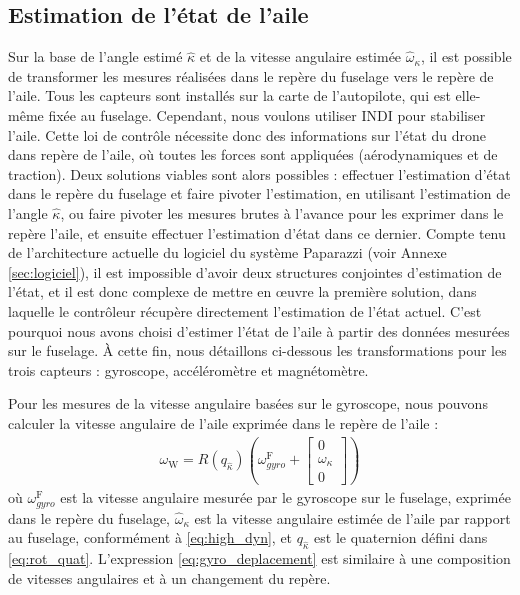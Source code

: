 \subsection{Estimation de l'état de l'aile}

Sur la base de l'angle estimé $\hat{\kappa}$ et de la vitesse angulaire estimée $\hat{\omega}_{\kappa}$, il est possible de transformer les mesures réalisées dans le repère du fuselage vers le repère de l'aile. Tous les capteurs sont installés sur la carte de l'autopilote, qui est elle-même fixée au fuselage. Cependant, nous voulons utiliser INDI pour stabiliser l'aile. Cette loi de contrôle nécessite donc des informations sur l'état du drone dans repère de l'aile, où toutes les forces sont appliquées (aérodynamiques et de traction).
Deux solutions viables sont alors possibles : effectuer l'estimation d'état dans le repère du fuselage et faire pivoter l'estimation, en utilisant l'estimation de l'angle $\hat{\kappa}$, ou faire pivoter les mesures brutes à l'avance pour les exprimer dans le repère l'aile, et ensuite effectuer l'estimation d'état dans ce dernier. 
Compte tenu de l'architecture actuelle du logiciel du système Paparazzi (voir Annexe \ref{sec:logiciel}), il est impossible d'avoir deux structures conjointes d'estimation de l'état, et il est donc complexe de mettre en œuvre la première solution, dans laquelle le contrôleur récupère directement l'estimation de l'état actuel. C'est pourquoi nous avons choisi d'estimer l'état de l'aile à partir des données mesurées sur le fuselage. À cette fin, nous détaillons ci-dessous les transformations pour les trois capteurs : gyroscope, accéléromètre et magnétomètre. 

Pour les mesures de la vitesse angulaire basées sur le gyroscope, nous pouvons calculer la vitesse angulaire de l'aile exprimée dans le repère de l'aile :
\begin{align}
    \label{eq:gyro_deplacement}
    \omega_{\text{W}} = R(q_{\hat{\kappa}}) \left( \omega_{gyro}^{\text{F}} + \begin{bmatrix}
    0\\ \omega_{\kappa} \\ 0
    \end{bmatrix}  \right) 
\end{align}
où $\omega_{gyro}^{\text{F}}$ est la vitesse angulaire mesurée par le gyroscope sur le fuselage, exprimée dans le repère du fuselage, $\hat{\omega}_{\kappa}$ est la vitesse angulaire estimée de l'aile par rapport au fuselage, conformément à \eqref{eq:high_dyn}, et $q_{\hat{\kappa}}$ est le quaternion défini dans \eqref{eq:rot_quat}.
L'expression \eqref{eq:gyro_deplacement} est similaire à une composition de vitesses angulaires et à un changement du repère.

